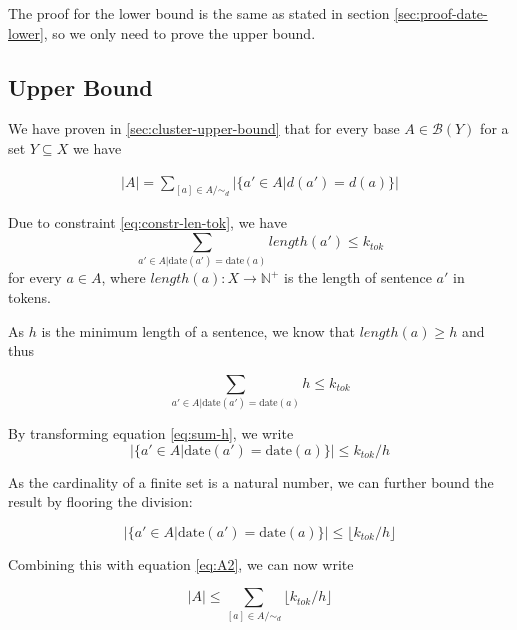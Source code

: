 \documentclass[a4paper,BCOR=10mm]{report}
\numberwithin{lemma}{chapter}
\numberwithin{definition}{chapter}
\begin{document}
\begin{appendices}
The proof for the lower bound is the same as stated in section \ref{sec:proof-date-lower}, so we only need to prove the upper bound.

\subsection{Upper Bound}

We have proven in \ref{sec:cluster-upper-bound} that for every base $A \in \mathcal{B}(Y)$ for a set $Y \subseteq X$ we have

\begin{align}
|A| = \sum_{[a] \in A/\sim_d} |\{ a' \in A | d(a') = d(a) \}|
\end{align}

Due to constraint \ref{eq:constr-len-tok}, we have
\begin{equation}
\sum_{ a' \in A | \text{date}(a') = \text{date}(a)} \mathit{length}(a') \leq k_{tok}
\end{equation}
for every $a \in A$, where $\mathit{length}(a) : X \rightarrow \mathbb{N}^+$ is the length of sentence $a'$ in tokens.

As $h$ is the minimum length of a sentence, we know that $\mathit{length}(a) \geq h$ and thus

\begin{equation}
\sum_{ a' \in A | \text{date}(a') = \text{date}(a)} h \leq k_{tok} \label{eq:sum-h}
\end{equation}

By transforming equation \ref{eq:sum-h}, we write
\begin{equation}
|\{ a' \in A | \text{date}(a') = \text{date}(a)\}| \leq k_{tok}/h
\end{equation}

As the cardinality of a finite set is a natural number, we can further bound the result by flooring the division:

\begin{equation}
|\{ a' \in A | \text{date}(a') = \text{date}(a)\}| \leq \lfloor k_{tok}/h \rfloor
\end{equation}


Combining this with equation \ref{eq:A2}, we can now write

\begin{equation}
|A| \leq \sum_{[a] \in A/\sim_d} \lfloor k_{tok}/h \rfloor
\end{equation}


\end{appendices}
\end{document}

